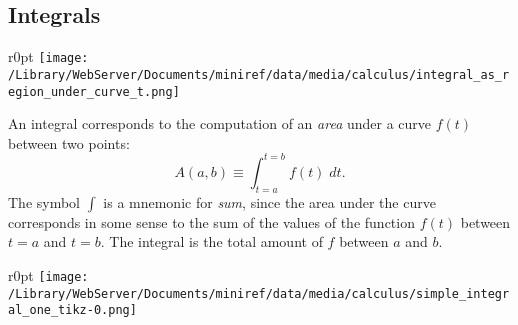 \documentclass[letterpaper,9pt,journal]{IEEEtran}
\newcommand{\dokuitalic}[1]{\textsl{#1}}
\begin{document}
\vspace{-3mm}
\subsection{Integrals}
\label{3369022ed3e212789ba2790306add593}%
\begin{wrapfigure}{r}{0pt}
\texttt{[image: /Library/WebServer/Documents/miniref/data/media/calculus/integral\_as\_region\_under\_curve\_t.png]}
\end{wrapfigure}

An integral corresponds to the computation of an \dokuitalic{area}
under a curve $f(t)$ between two points:
\[
 A(a,b) \equiv \int_{t=a}^{t=b} f(t)\;dt.
\]
The symbol $\int$ is a mnemonic for \dokuitalic{sum}, 
since the area under the curve corresponds in some
sense to the sum of the values of the function $f(t)$
between $t=a$ and $t=b$.
The integral is the total amount of $f$ between $a$ and $b$.
%



\begin{wrapfigure}{r}{0pt}
\texttt{[image: /Library/WebServer/Documents/miniref/data/media/calculus/simple\_integral\_one\_tikz-0.png]}
\end{wrapfigure}
\end{document}
